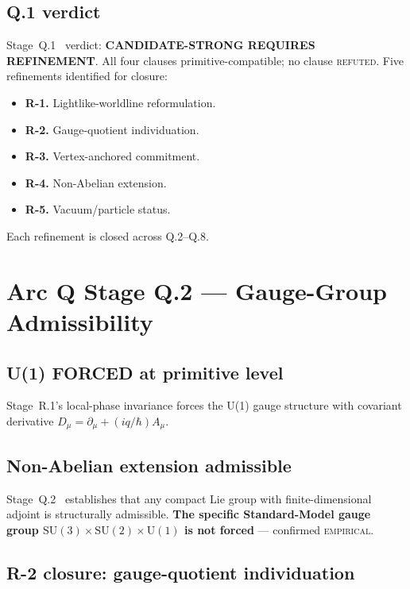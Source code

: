 \documentclass[11pt,a4paper]{article}
\begin{document}
\subsection{Q.1 verdict}

Stage~Q.1~\cite{q1grh} verdict: \textbf{CANDIDATE-STRONG REQUIRES REFINEMENT}. All four clauses primitive-compatible; no clause \textsc{refuted}. Five refinements identified for closure:
\begin{itemize}
  \item \textbf{R-1.} Lightlike-worldline reformulation.
  \item \textbf{R-2.} Gauge-quotient individuation.
  \item \textbf{R-3.} Vertex-anchored commitment.
  \item \textbf{R-4.} Non-Abelian extension.
  \item \textbf{R-5.} Vacuum/particle status.
\end{itemize}

Each refinement is closed across Q.2--Q.8.

\section{Arc Q Stage Q.2 --- Gauge-Group Admissibility}

\subsection{U(1) FORCED at primitive level}

Stage~R.1's local-phase invariance forces the U(1) gauge structure with covariant derivative $D_\mu = \partial_\mu + (iq/\hbar) A_\mu$.

\subsection{Non-Abelian extension admissible}

Stage~Q.2~\cite{q2gauge} establishes that any compact Lie group with finite-dimensional adjoint is structurally admissible. \textbf{The specific Standard-Model gauge group $\mathrm{SU}(3) \times \mathrm{SU}(2) \times \mathrm{U}(1)$ is not forced} --- confirmed \textsc{empirical}.

\subsection{R-2 closure: gauge-quotient individuation}
\end{document}
